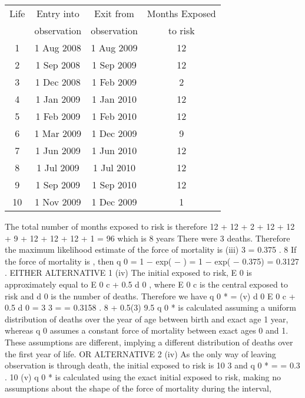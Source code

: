 \documentclass[a4paper,12pt]{article}
\begin{document}
\begin{enumerate}
\begin{center}
\begin{tabular}{|c|c|c|c|} \hline
Life 	&	Entry into 	&	Exit from 	&	Months Exposed	\\
	&	observation	&	observation	&	to risk	\\ \hline
1	&	1 Aug 2008	&	1 Aug 2009	&	12	\\ \hline
2	&	1 Sep 2008	&	1 Sep 2009	&	12	\\ \hline
3	&	1 Dec 2008	&	1 Feb 2009	&	2	\\ \hline
4	&	1 Jan 2009	&	1 Jan 2010	&	12	\\ \hline
5	&	1 Feb 2009	&	1 Feb 2010	&	12	\\ \hline
6	&	1 Mar 2009	&	1 Dec 2009	&	9	\\ \hline
7	&	1 Jun 2009	&	1 Jun 2010	&	12	\\ \hline
8	&	1 Jul 2009	&	1 Jul 2010	&	12	\\ \hline
9	&	1 Sep 2009	&	1 Sep 2010	&	12	\\ \hline
10	&	1 Nov 2009	&	1 Dec 2009	&	1	\\ \hline
\end{tabular}
\end{center}
The total number of months exposed to risk is therefore
12 + 12 + 2 + 12 + 12 + 9 + 12 + 12 + 12 + 1 = 96
which is 8 years
There were 3 deaths.
Therefore the maximum likelihood estimate of the force of mortality is
(iii)
3
= 0.375 .
8
If the force of mortality is  , then
q 0 = 1 − exp( − ) = 1 − exp( − 0.375) = 0.3127 .
EITHER ALTERNATIVE 1
(iv)
The initial exposed to risk, E 0 is approximately equal to E 0 c + 0.5 d 0 , where E 0 c is the
central exposed to risk and d 0 is the number of deaths.
Therefore we have
q 0 * =
(v)
d 0
E 0 c
+ 0.5 d 0
=
3
3
=
= 0.3158 .
8 + 0.5(3) 9.5
q 0 * is calculated assuming a uniform distribution of deaths over the year of age
between birth and exact age 1 year, whereas q 0 assumes a constant force of mortality
between exact ages 0 and 1.
These assumptions are different, implying a different distribution of deaths over the
first year of life.
OR ALTERNATIVE 2
(iv) As the only way of leaving observation is through death, the initial exposed to risk is 10
3
and q 0 * =
= 0.3 .
10
(v) q 0 * is calculated using the exact initial exposed to risk, making no assumptions about
the shape of the force of mortality during the interval,

\end{enumerate}
\end{document}
